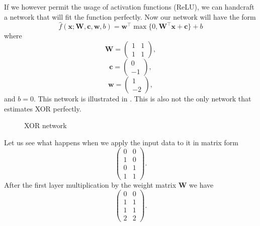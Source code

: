If we however permit the usage of activation functions (ReLU), we can handcraft a network that will fit the function perfectly. Now our network will have the form 
$$\widehat{f}(\textbf{x};\textbf{W},\textbf{c},\textbf{w},b)=\textbf{w}^\top \max\{0,\textbf{W}^\top\textbf{x}+\textbf{c}\}+b$$ 
where 
$$\textbf{W}=
\left(\begin{matrix}
	1 & 1\\
	1 & 1
\end{matrix}\right),$$
$$\textbf{c}=
\left(\begin{matrix}
	0\\
	-1
\end{matrix}\right),$$
$$\textbf{w}=
\left(\begin{matrix}
	1\\
	-2
\end{matrix}\right),$$
and $b=0$. This network is illustrated in . This is also not the only network that estimates XOR perfectly.
\begin{figure}[h]
\caption{XOR network}
\center
\label{xordiagram}
\end{figure}

Let us see what happens when we apply the input data to it in matrix form $$
\left(\begin{matrix}
	0 & 0\\
	1 & 0\\
	0 & 1\\
	1 & 1
\end{matrix}\right).$$
After the first layer multiplication by the weight matrix $\textbf{W}$ we have
$$\left(\begin{matrix}
	0 & 0\\
	1 & 1\\
	1 & 1\\
	2 & 2
\end{matrix}\right).$$

